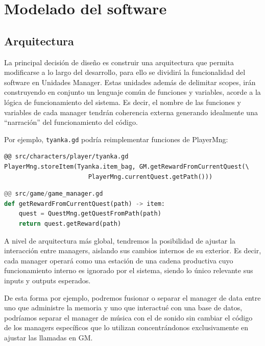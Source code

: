 
\section{Modelado del software}\label{modelado:modelado-del-software}

\subsection{Arquitectura}\label{modelado:arquitectura}
La principal decisión de diseño es construir una arquitectura que permita modificarse a lo largo del desarrollo, para ello se dividirá la funcionalidad del software en Unidades Manager. Estas unidades además de delimitar scopes, irán construyendo en conjunto un lenguaje común de funciones y variables, acorde a la lógica de funcionamiento del sistema. Es decir, el nombre de las funciones y variables de cada manager tendrán coherencia externa generando idealmente una “narración” del funcionamiento del código.

Por ejemplo, \texttt{tyanka.gd} podría reimplementar funciones de PlayerMng:
\begin{lstlisting}
@@ src/characters/player/tyanka.gd
PlayerMng.storeItem(Tyanka.item_bag, GM.getRewardFromCurrentQuest(\
                       PlayerMng.currentQuest.getPath()))
\end{lstlisting}
\begin{lstlisting}[language=Python]
@@ src/game/game_manager.gd
def getRewardFromCurrentQuest(path) -> item:
    quest = QuestMng.getQuestFromPath(path)
    return quest.getReward(path)
\end{lstlisting}

A nivel de arquitectura más global, tendremos la posibilidad de ajustar la interacción entre managers, aislando sus cambios internos de su exterior. Es decir, cada manager operará como una estación de una cadena productiva cuyo funcionamiento interno es ignorado por el sistema, siendo lo único relevante sus inputs y outputs esperados.

De esta forma por ejemplo, podremos fusionar o separar el manager de data entre uno que administre la memoria y uno que interactué con una base de datos, podríamos separar el manager de música con el de sonido sin cambiar el código de los managers específicos que lo utilizan concentrándonos exclusivamente en ajustar las llamadas en GM.

